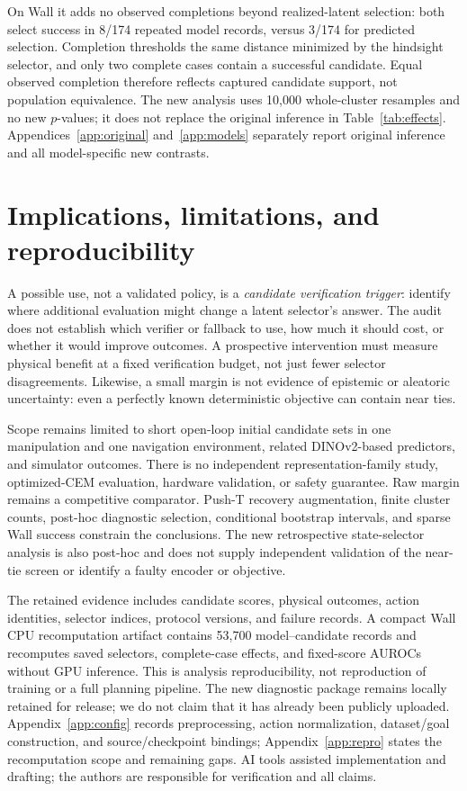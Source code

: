 \documentclass{article}
\begin{document}
On Wall it adds no observed completions beyond realized-latent selection:
both select success in 8/174 repeated model records, versus 3/174 for predicted
selection. Completion thresholds the same distance minimized by the hindsight
selector, and only two complete cases contain a successful candidate. Equal
observed completion therefore reflects captured candidate support, not
population equivalence. The new analysis uses 10,000 whole-cluster resamples
and no new $p$-values; it does not replace the original inference in
Table~\ref{tab:effects}. Appendices~\ref{app:original} and~\ref{app:models}
separately report original inference and all model-specific new contrasts.

\section{Implications, limitations, and reproducibility}

A possible use, not a validated policy, is a \emph{candidate verification trigger}: identify where
additional evaluation might change a latent selector's answer. The audit does
not establish which verifier or fallback to use, how much it should cost, or
whether it would improve outcomes. A prospective intervention must measure
physical benefit at a fixed verification budget, not just fewer selector
disagreements. Likewise, a small margin is not evidence of epistemic or
aleatoric uncertainty: even a perfectly known deterministic objective can
contain near ties.

Scope remains limited to short open-loop initial candidate sets in one manipulation
and one navigation environment, related DINOv2-based predictors, and simulator
outcomes. There is no independent representation-family study, optimized-CEM
evaluation, hardware validation, or safety guarantee. Raw margin remains a
competitive comparator. Push-T recovery augmentation, finite cluster counts,
post-hoc diagnostic selection, conditional bootstrap intervals, and sparse
Wall success constrain the conclusions.
The new retrospective state-selector analysis is also post-hoc and does not
supply independent validation of the near-tie screen or identify a faulty
encoder or objective.

The retained evidence includes candidate scores, physical outcomes, action
identities, selector indices, protocol versions, and failure records. A compact
Wall CPU recomputation artifact contains 53,700 model--candidate records and
recomputes saved selectors, complete-case effects, and fixed-score AUROCs
without GPU inference. This is analysis reproducibility, not reproduction of
training or a full planning pipeline. The new diagnostic package remains
locally retained for release; we do not claim that it has already been
publicly uploaded. Appendix~\ref{app:config} records preprocessing, action
normalization, dataset/goal construction, and source/checkpoint bindings;
Appendix~\ref{app:repro} states the recomputation scope and remaining gaps.
AI tools assisted implementation and
drafting; the authors are responsible for verification and all claims.
\end{document}
